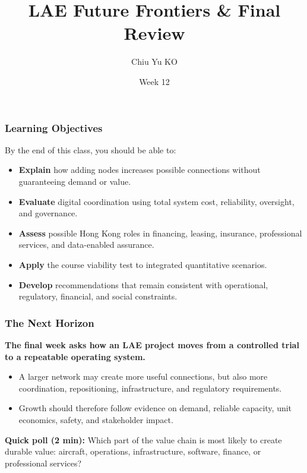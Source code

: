 \documentclass{beamer}
\begin{document}
\begin{frame}
  \title{LAE Future Frontiers \& Final Review}
  \author{Chiu Yu KO}
  \date{Week 12}
  \titlepage
\end{frame}

\begin{frame}[t]
\frametitle{Learning Objectives}
By the end of this class, you should be able to:
\begin{itemize}
\item \textbf{Explain} how adding nodes increases possible connections without guaranteeing demand or value.
\item \textbf{Evaluate} digital coordination using total system cost, reliability, oversight, and governance.
\item \textbf{Assess} possible Hong Kong roles in financing, leasing, insurance, professional services, and data-enabled assurance.
\item \textbf{Apply} the course viability test to integrated quantitative scenarios.
\item \textbf{Develop} recommendations that remain consistent with operational, regulatory, financial, and social constraints.
\end{itemize}
\end{frame}

\begin{frame}[t]
\frametitle{The Next Horizon}
\textbf{The final week asks how an LAE project moves from a controlled trial to a repeatable operating system.}
\begin{itemize}
\item A larger network may create more useful connections, but also more coordination, repositioning, infrastructure, and regulatory requirements.
\item Growth should therefore follow evidence on demand, reliable capacity, unit economics, safety, and stakeholder impact.
\end{itemize}
\vspace{0.3cm}
\textbf{Quick poll (2 min):} Which part of the value chain is most likely to create durable value: aircraft, operations, infrastructure, software, finance, or professional services?
\end{frame}
\end{document}
